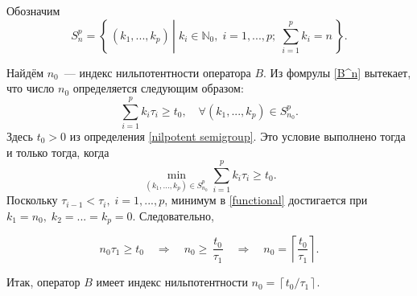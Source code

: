 \documentclass{article}
\renewcommand{\ge}{\geqslant}
\theoremstyle{definition}
\begin{document}
Обозначим
\begin{equation*}
S^p_n = \left\{\,(k_1, ..., k_p) \, \left| \; k_i \in \mathbb{N}_0, \; i = 1,...,p; \; \sum_{i = 1}^{p}k_i = n \right. \,\right\}.
\end{equation*}

Найдём $n_0$~--- индекс нильпотентности оператора $B$.
Из фомрулы \eqref{B^n} вытекает, что число $n_0$ определяется следующим образом:
\begin{equation*}
	\sum\limits_{i = 1}^{p} k_i \tau_i \ge t_0, \quad \forall (k_1,...,k_p) \in S^p_{n_0}.
\end{equation*}
Здесь $ t_0 > 0 $ из определения \ref{nilpotent semigroup}. Это условие выполнено тогда и только тогда, когда
\begin{equation} \label{functional}
	\min_{(k_1, ..., k_p) \in S^p_{n_0}} \sum\limits_{i = 1}^{p} k_i \tau_i \ge t_0.
\end{equation}
Поскольку $\tau_{i - 1} < \tau_i, \; i = 1,...,p$, минимум в \eqref{functional} достигается 
при $ k_1 = n_0, \; k_2 = ... = k_p = 0 $. Следовательно,
\begin{onehalfspacing}
	\begin{equation*}
	n_0 \tau_1 \ge t_0 \quad \Longrightarrow \quad n_0 \ge \, \frac{t_0}{\tau_1} \quad \Longrightarrow \quad 
	n_0 = \left\lceil \frac{t_0}{\tau_1} \right\rceil.
	\end{equation*}
\end{onehalfspacing}
Итак, оператор $B$ имеет индекс нильпотентности $ n_0 = \left\lceil t_0 / \tau_1 \right\rceil $. 
\end{document}
